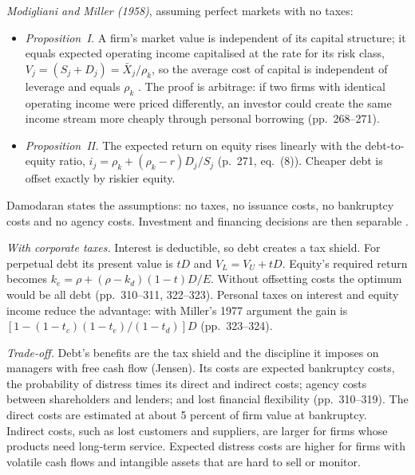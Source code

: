 \begin{qfmodel}\label{mod:capital-structure-theory}
 \emph{Modigliani and Miller (1958)}, assuming perfect markets with no taxes:
\begin{itemize}
\item \emph{Proposition~I.} A firm's market value is independent of its capital structure; it equals expected operating income capitalised at the rate for its risk class, $V_j=(S_j+D_j)=\bar X_j/\rho_k$, so the average cost of capital is independent of leverage and equals $\rho_k$ \citep[p.~268, eqs.~(3)--(4)]{modigliani-miller-1958}. The proof is arbitrage: if two firms with identical operating income were priced differently, an investor could create the same income stream more cheaply through personal borrowing (pp.~268--271).
\item \emph{Proposition~II.} The expected return on equity rises linearly with the debt-to-equity ratio, $i_j=\rho_k+(\rho_k-r)D_j/S_j$ (p.~271, eq.~(8)). Cheaper debt is offset exactly by riskier equity.
\end{itemize}
Damodaran states the assumptions: no taxes, no issuance costs, no bankruptcy costs and no agency costs. Investment and financing decisions are then separable \citep[pp.~320--325]{applied-corporate-finance-2014}.

\emph{With corporate taxes.} Interest is deductible, so debt creates a tax shield. For perpetual debt its present value is $tD$ and $V_L=V_U+tD$. Equity's required return becomes $k_e=\rho+(\rho-k_d)(1-t)D/E$. Without offsetting costs the optimum would be all debt (pp.~310--311, 322--323). Personal taxes on interest and equity income reduce the advantage: with Miller's 1977 argument the gain is $[1-(1-t_c)(1-t_e)/(1-t_d)]D$ (pp.~323--324).

\emph{Trade-off.} Debt's benefits are the tax shield and the discipline it imposes on managers with free cash flow (Jensen). Its costs are expected bankruptcy costs, the probability of distress times its direct and indirect costs; agency costs between shareholders and lenders; and lost financial flexibility (pp.~310--319). The direct costs are estimated at about 5 percent of firm value at bankruptcy. Indirect costs, such as lost customers and suppliers, are larger for firms whose products need long-term service. Expected distress costs are higher for firms with volatile cash flows and intangible assets that are hard to sell or monitor.


\end{qfmodel}
